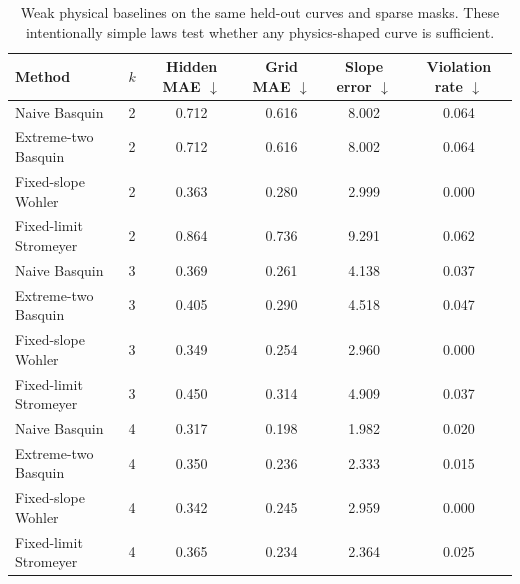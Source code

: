 \begin{table}[t]
\caption{Weak physical baselines on the same held-out curves and sparse masks. These intentionally simple laws test whether any physics-shaped curve is sufficient.}
\label{tab:weak_physics}
\centering\scriptsize\setlength{\tabcolsep}{5pt}
\begin{tabular}{lccccc}
\toprule
Method & $k$ & Hidden MAE $\downarrow$ & Grid MAE $\downarrow$ & Slope error $\downarrow$ & Violation rate $\downarrow$ \\
\midrule
Naive Basquin & 2 & 0.712 & 0.616 & 8.002 & 0.064 \\
Extreme-two Basquin & 2 & 0.712 & 0.616 & 8.002 & 0.064 \\
Fixed-slope Wohler & 2 & 0.363 & 0.280 & 2.999 & 0.000 \\
Fixed-limit Stromeyer & 2 & 0.864 & 0.736 & 9.291 & 0.062 \\
\addlinespace[2pt]
Naive Basquin & 3 & 0.369 & 0.261 & 4.138 & 0.037 \\
Extreme-two Basquin & 3 & 0.405 & 0.290 & 4.518 & 0.047 \\
Fixed-slope Wohler & 3 & 0.349 & 0.254 & 2.960 & 0.000 \\
Fixed-limit Stromeyer & 3 & 0.450 & 0.314 & 4.909 & 0.037 \\
\addlinespace[2pt]
Naive Basquin & 4 & 0.317 & 0.198 & 1.982 & 0.020 \\
Extreme-two Basquin & 4 & 0.350 & 0.236 & 2.333 & 0.015 \\
Fixed-slope Wohler & 4 & 0.342 & 0.245 & 2.959 & 0.000 \\
Fixed-limit Stromeyer & 4 & 0.365 & 0.234 & 2.364 & 0.025 \\
\bottomrule
\end{tabular}
\end{table}
